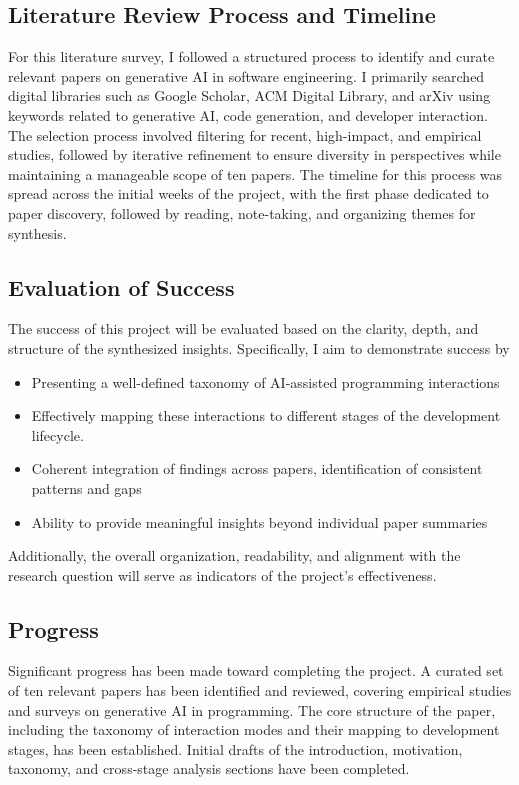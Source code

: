 \subsection*{Literature Review Process and Timeline}

For this literature survey, I followed a structured process to identify and curate relevant papers on generative AI in software engineering. I primarily searched digital libraries such as Google Scholar, ACM Digital Library, and arXiv using keywords related to generative AI, code generation, and developer interaction. The selection process involved filtering for recent, high-impact, and empirical studies, followed by iterative refinement to ensure diversity in perspectives while maintaining a manageable scope of ten papers. The timeline for this process was spread across the initial weeks of the project, with the first phase dedicated to paper discovery, followed by reading, note-taking, and organizing themes for synthesis.

\subsection*{Evaluation of Success}
The success of this project will be evaluated based on the clarity, depth, and structure of the synthesized insights. Specifically, I aim to demonstrate success by
\begin{itemize}
    \item Presenting a well-defined taxonomy of AI-assisted programming interactions
    \item Effectively mapping these interactions to different stages of the development lifecycle.
    \item Coherent integration of findings across papers, identification of consistent patterns and gaps
    \item Ability to provide meaningful insights beyond individual paper summaries
\end{itemize}
Additionally, the overall organization, readability, and alignment with the research question will serve as indicators of the project's effectiveness.

\subsection*{Progress}
Significant progress has been made toward completing the project. A curated set of ten relevant papers has been identified and reviewed, covering empirical studies and surveys on generative AI in programming. The core structure of the paper, including the taxonomy of interaction modes and their mapping to development stages, has been established. Initial drafts of the introduction, motivation, taxonomy, and cross-stage analysis sections have been completed.


